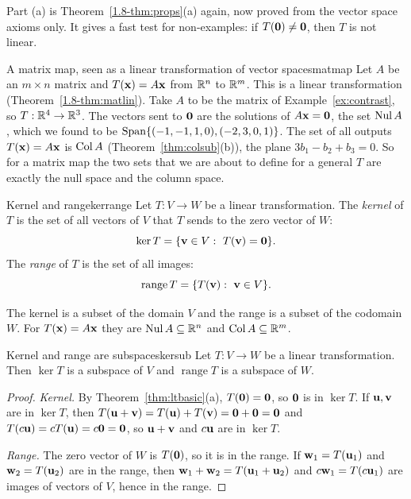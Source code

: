 \documentclass[11pt]{article}
\begin{document}
Part (a) is Theorem~\ref{1.8-thm:props}(a) again, now proved from the vector space axioms only. It gives a fast test for non-examples: if $T(\mathbf{0})\neq\mathbf{0}$, then $T$ is not linear.

\begin{exmp}{A matrix map, seen as a linear transformation of vector spaces}{matmap}
Let $A$ be an $m\times n$ matrix and $T(\mathbf{x})=A\mathbf{x}$ from $\mathbb{R}^n$ to $\mathbb{R}^m$. This is a linear transformation (Theorem~\ref{1.8-thm:matlin}). Take $A$ to be the matrix of Example~\ref{ex:contrast}, so $T:\mathbb{R}^4\to\mathbb{R}^3$. The vectors sent to $\mathbf{0}$ are the solutions of $A\mathbf{x}=\mathbf{0}$, the set $\operatorname{Nul} A$, which we found to be $\operatorname{Span}\{(-1,-1,1,0),(-2,3,0,1)\}$. The set of all outputs $T(\mathbf{x})=A\mathbf{x}$ is $\operatorname{Col} A$ (Theorem~\ref{thm:colsub}(b)), the plane $3b_1-b_2+b_3=0$. So for a matrix map the two sets that we are about to define for a general $T$ are exactly the null space and the column space.
\end{exmp}

\begin{defn}{Kernel and range}{kerrange}
Let $T:V\to W$ be a linear transformation. The \emph{kernel} of $T$ is the set of all vectors of $V$ that $T$ sends to the zero vector of $W$:
\[
\ker T=\{\bv{v}\in V:\ T(\bv{v})=\bv{0}\}.
\]
The \emph{range} of $T$ is the set of all images:
\[
\operatorname{range}T=\{T(\mathbf{v}):\ \mathbf{v}\in V\}.
\]
\end{defn}

The kernel is a subset of the domain $V$ and the range is a subset of the codomain $W$. For $T(\mathbf{x})=A\mathbf{x}$ they are $\operatorname{Nul} A\subseteq\mathbb{R}^n$ and $\operatorname{Col} A\subseteq\mathbb{R}^m$.

\begin{thm}{Kernel and range are subspaces}{kersub}
Let $T:V\to W$ be a linear transformation. Then $\ker T$ is a subspace of $V$ and $\operatorname{range}T$ is a subspace of $W$.
\end{thm}

\begin{proof}
\emph{Kernel.} By Theorem~\ref{thm:ltbasic}(a), $T(\mathbf{0})=\mathbf{0}$, so $\mathbf{0}$ is in $\ker T$. If $\mathbf{u},\mathbf{v}$ are in $\ker T$, then $T(\mathbf{u}+\mathbf{v})=T(\mathbf{u})+T(\mathbf{v})=\mathbf{0}+\mathbf{0}=\mathbf{0}$ and $T(c\mathbf{u})=cT(\mathbf{u})=c\mathbf{0}=\mathbf{0}$, so $\mathbf{u}+\mathbf{v}$ and $c\mathbf{u}$ are in $\ker T$.

\emph{Range.} The zero vector of $W$ is $T(\mathbf{0})$, so it is in the range. If $\mathbf{w}_1=T(\mathbf{u}_1)$ and $\mathbf{w}_2=T(\mathbf{u}_2)$ are in the range, then $\mathbf{w}_1+\mathbf{w}_2=T(\mathbf{u}_1+\mathbf{u}_2)$ and $c\mathbf{w}_1=T(c\mathbf{u}_1)$ are images of vectors of $V$, hence in the range.
\end{proof}
\end{document}

